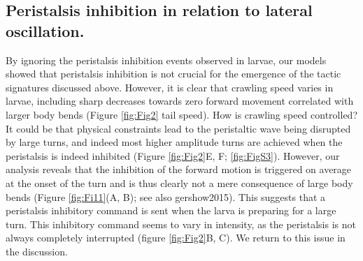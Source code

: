 \documentclass[10pt,a4paper]{article}
\begin{document}
\subsection{Peristalsis inhibition in relation to lateral oscillation.}
By ignoring the peristalsis inhibition events observed in larvae, our models showed that peristalsis inhibition is not crucial for the emergence of the tactic signatures discussed above. However, it is clear that crawling speed varies in larvae, including sharp decreases towards zero forward movement correlated with larger body bends (Figure \ref{fig:Fig2} tail speed). How is crawling speed controlled? It could be that physical constraints lead to the peristaltic wave being disrupted by large turns, and indeed most higher amplitude turns are achieved when the peristalsis is indeed inhibited (Figure \ref{fig:Fig2}E, F; \ref{fig:FigS3}). However, our analysis reveals that the inhibition of the forward motion is triggered on average at the onset of the turn and is thus clearly not a mere consequence of large body bends (Figure \ref{fig:Fi11}(A, B); see also gershow2015). This suggests that a peristalsis inhibitory command is sent when the larva is preparing for a large turn. This inhibitory command seems to vary in intensity, as the peristalsis is not always completely interrupted (figure \ref{fig:Fig2}B, C). We return to this issue in the discussion.
\end{document}
